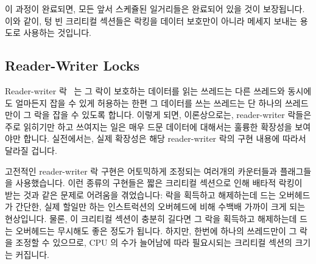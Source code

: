 {	이 과정이 완료되면, 모든 앞서 스케쥴된 일거리들은 완료되어 있을 것이
	보장됩니다.
	이와 같이, 텅 빈 크리티컬 섹션들은 락킹을 데이터 보호만이 아니라 메세지
	보내는 용도로 사용하는 것입니다.

} \QuickQuizEnd

\QuickQuizLabel{\QlockingQemptycriticalsection}

\subsection{Reader-Writer Locks}
\label{sec:locking:Reader-Writer Locks}

Reader-writer 락~\cite{Courtois71} 는 그 락이 보호하는 데이터를 읽는 쓰레드는
다른 쓰레드와 동시에도 얼마든지 잡을 수 있게 허용하는 한편 그 데이터를 쓰는
쓰레드는 단 하나의 쓰레드만이 그 락을 잡을 수 있도록 합니다.
이렇게 되면, 이론상으로는, reader-writer 락들은 주로 읽히기만 하고 쓰여지는
일은 매우 드문 데이터에 대해서는 훌륭한 확장성을 보여야만 합니다.
실전에서는, 실제 확장성은 해당 reader-writer 락의 구현 내용에 따라서 달라질
겁니다.

고전적인 reader-writer 락 구현은 어토믹하게 조정되는 여러개의 카운터들과
플래그들을 사용했습니다.
이런 종류의 구현들은 짧은 크리티컬 섹션으로 인해 배타적 락킹이 받는 것과 같은
문제로 어려움을 겪었습니다: 락을 획득하고 해제하는데 드는 오버헤드가 간단한,
실제 할일만 하는 인스트럭션의 오버헤드에 비해 수백배 가까이 크게 되는
현상입니다.
물론, 이 크리티컬 섹션이 충분히 길다면 그 락을 획득하고 해제하는데 드는
오버헤드는 무시해도 좋은 정도가 됩니다.
하지만, 한번에 하나의 쓰레드만이 그 락을 조정할 수 있으므로, CPU 의 수가
늘어남에 따라 필요시되는 크리티컬 섹션의 크기는 커집니다.

